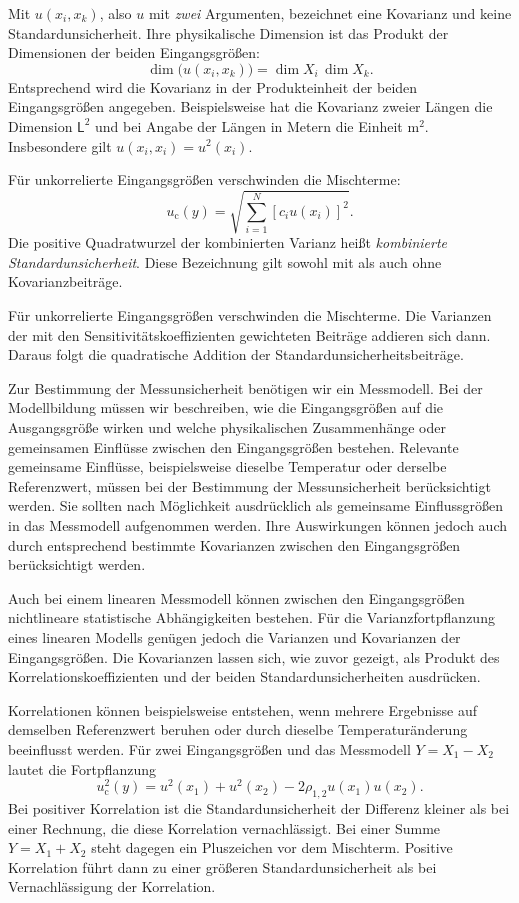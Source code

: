 Mit $u(x_i,x_k)$, also $u$ mit \emph{zwei} Argumenten, bezeichnet eine Kovarianz und keine Standardunsicherheit. Ihre physikalische Dimension ist das Produkt der Dimensionen der beiden Eingangsgrößen:
\begin{equation}
\dim\bigl(u(x_i,x_k)\bigr)=\dim X_i\,\dim X_k.
\end{equation}
Entsprechend wird die Kovarianz in der Produkteinheit der beiden
Eingangsgrößen angegeben. Beispielsweise hat die Kovarianz zweier
Längen die Dimension $\mathsf L^2$ und bei Angabe der Längen in
Metern die Einheit $\mathrm{m}^2$.
Insbesondere gilt $u(x_i,x_i)=u^2(x_i)$.

Für unkorrelierte Eingangsgrößen verschwinden die Mischterme:
\begin{equation}
u_{\mathrm c}(y)=\sqrt{\sum_{i=1}^N[c_i u(x_i)]^2}.
\label{eq:UnkorrelierteFortpflanzung}
\end{equation}
Die positive Quadratwurzel der kombinierten Varianz heißt
\textsl{kombinierte Standardunsicherheit}. Diese Bezeichnung
gilt sowohl mit als auch ohne Kovarianzbeiträge.

Für unkorrelierte Eingangsgrößen verschwinden die Mischterme.
Die Varianzen der mit den Sensitivitätskoeffizienten
gewichteten Beiträge addieren sich dann. Daraus folgt
die quadratische Addition der Standardunsicherheitsbeiträge.

Zur Bestimmung der Messunsicherheit benötigen wir ein Messmodell.
Bei der Modellbildung müssen wir beschreiben, wie die
Eingangsgrößen auf die Ausgangsgröße wirken und welche
physikalischen Zusammenhänge oder gemeinsamen Einflüsse
zwischen den Eingangsgrößen bestehen. Relevante gemeinsame Einflüsse, 
beispielsweise dieselbe Temperatur oder derselbe Referenzwert, müssen bei der
Bestimmung der Messunsicherheit berücksichtigt werden.
Sie sollten nach Möglichkeit ausdrücklich als gemeinsame
Einflussgrößen in das Messmodell aufgenommen werden.
Ihre Auswirkungen können jedoch auch durch entsprechend
bestimmte Kovarianzen zwischen den Eingangsgrößen
berücksichtigt werden.


Auch bei einem linearen Messmodell können zwischen den
Eingangsgrößen nichtlineare statistische Abhängigkeiten bestehen.
Für die Varianzfortpflanzung eines linearen Modells genügen
jedoch die Varianzen und Kovarianzen der Eingangsgrößen.
Die Kovarianzen lassen sich, wie zuvor gezeigt, als Produkt
des Korrelationskoeffizienten und der beiden
Standardunsicherheiten ausdrücken.

Korrelationen können beispielsweise entstehen, wenn mehrere
Ergebnisse auf demselben Referenzwert beruhen oder durch dieselbe
Temperaturänderung beeinflusst werden. Für zwei Eingangsgrößen
und das Messmodell $Y=X_1-X_2$ lautet die Fortpflanzung
\begin{equation}
u_{\mathrm c}^2(y)
=
u^2(x_1)+u^2(x_2)
-2\rho_{1,2}u(x_1)u(x_2).
\end{equation}
Bei positiver Korrelation ist die Standardunsicherheit der
Differenz kleiner als bei einer Rechnung, die diese Korrelation
vernachlässigt. Bei einer Summe $Y=X_1+X_2$ steht dagegen ein
Pluszeichen vor dem Mischterm. Positive Korrelation führt dann
zu einer größeren Standardunsicherheit als bei Vernachlässigung
der Korrelation.

